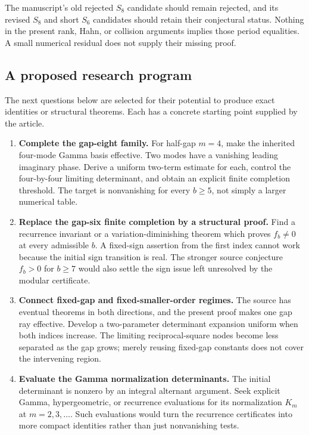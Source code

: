 \documentclass[11pt,a4paper]{article}
\theoremstyle{definition}
\theoremstyle{remark}
\numberwithin{equation}{section}
\begin{document}
The manuscript's old rejected $S_8$ candidate should remain
rejected, and its revised $S_8$ and short $S_6$ candidates should
retain their conjectural status. Nothing in the present rank,
Hahn, or collision arguments implies those period equalities.
A small numerical residual does not supply their missing proof.

\subsection{A proposed research program}

The next questions below are selected for their potential to
produce exact identities or structural theorems. Each has a
concrete starting point supplied by the article.

\begin{enumerate}[label=\textbf{Q\arabic*.},leftmargin=*]
\item \textbf{Complete the gap-eight family.}
For half-gap $m=4$, make the inherited four-mode Gamma basis
effective. Two modes have a vanishing leading imaginary phase.
Derive a uniform two-term estimate for each, control the
four-by-four limiting determinant, and obtain an explicit finite
completion threshold. The target is nonvanishing for every
$b\ge5$, not simply a larger numerical table.

\item \textbf{Replace the gap-six finite completion by a structural proof.}
Find a recurrence invariant or a variation-diminishing theorem
which proves $f_b\ne0$ at every admissible $b$. A fixed-sign
assertion from the first index cannot work because the initial
sign transition is real. The stronger source conjecture
$f_b>0$ for $b\ge7$ would also settle the sign issue left
unresolved by the modular certificate.

\item \textbf{Connect fixed-gap and fixed-smaller-order regimes.}
The source has eventual theorems in both directions, and the
present proof makes one gap ray effective. Develop a
two-parameter determinant expansion uniform when both indices
increase. The limiting reciprocal-square nodes become less
separated as the gap grows; merely reusing fixed-gap constants
does not cover the intervening region.

\item \textbf{Evaluate the Gamma normalization determinants.}
The initial determinant is nonzero by an integral alternant
argument. Seek explicit Gamma, hypergeometric, or recurrence
evaluations for its normalization $K_m$ at $m=2,3,\ldots$.
Such evaluations would turn the recurrence certificates into
more compact identities rather than just nonvanishing tests.


\end{enumerate}
\end{document}

